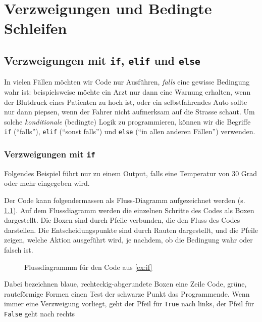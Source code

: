 
\chapter{Verzweigungen und Bedingte Schleifen}\label{ch:K03Logical}

\section{Verzweigungen mit \texorpdfstring{\lstinline|if|}{if}, \texorpdfstring{\lstinline|elif|}{elif} und \texorpdfstring{\lstinline|else|}{else}}
In vielen Fällen möchten wir Code nur Ausführen, \textit{falls} eine gewisse Bedingung wahr ist: beispielsweise möchte ein Arzt nur dann eine Warnung erhalten, wenn der Blutdruck eines Patienten zu hoch ist, oder ein selbstfahrendes Auto sollte nur dann piepsen, wenn der Fahrer nicht aufmerksam auf die Strasse schaut. Um solche \textit{konditionale} (bedingte) Logik zu programmieren, können wir die Begriffe \lstinline|if| (\enquote{falls}), \lstinline|elif| (\enquote{sonst falls}) und \lstinline|else| (\enquote{in allen anderen Fällen}) verwenden.

\subsection{Verzweigungen mit \texorpdfstring{\lstinline|if|}{if}}

\begin{myexample}\label{ex:if}
Folgendes Beispiel führt nur zu einem Output, falls eine Temperatur von 30 Grad oder mehr eingegeben wird.


Der Code kann folgendermassen als Fluss-Diagramm aufgezeichnet werden (s. \cref{fig:if-flussdiagramm}).
Auf dem Flussdiagramm werden die einzelnen Schritte des Codes als Boxen dargestellt. Die Boxen sind durch Pfeile verbunden, die den Fluss des Codes darstellen. Die Entscheidungspunkte sind durch Rauten dargestellt, und die Pfeile zeigen, welche Aktion ausgeführt wird, je nachdem, ob die Bedingung wahr oder falsch ist.

\begin{figure}[H]
	\centering
	
	\caption{Flussdiagrammm für den Code aus \cref{ex:if}}
	\label{fig:if-flussdiagramm}
\end{figure}
Dabei bezeichnen blaue, rechteckig-abgerundete Boxen eine Zeile Code, grüne, rauteförmige Formen einen Test der schwarze Punkt das Programmende. Wenn immer eine Verzweigung vorliegt, geht der Pfeil für \lstinline|True| nach links, der Pfeil für \lstinline|False| geht nach rechts
\end{myexample}

